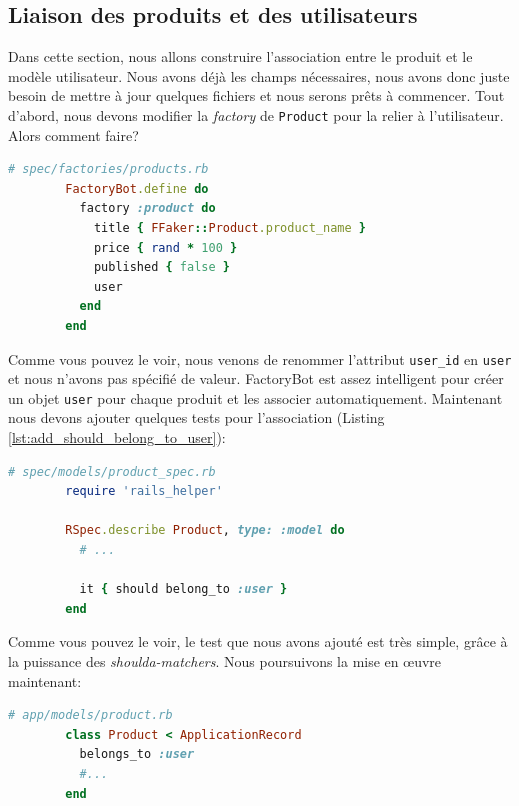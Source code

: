 \documentclass[]{report}
\begin{document}
    \subsection{Liaison des produits et des utilisateurs}\label{subsec:user_has_products}

      Dans cette section, nous allons construire l'association entre le produit et le modèle utilisateur. Nous avons déjà les champs nécessaires, nous avons donc juste besoin de mettre à jour quelques fichiers et nous serons prêts à commencer. Tout d'abord, nous devons modifier la \textit{factory} de \verb|Product| pour la relier à l'utilisateur. Alors comment faire?

      \begin{scriptsize}
        \begin{lstlisting}[language=ruby]
        # spec/factories/products.rb
        FactoryBot.define do
          factory :product do
            title { FFaker::Product.product_name }
            price { rand * 100 }
            published { false }
            user
          end
        end
        \end{lstlisting}
      \end{scriptsize}

      Comme vous pouvez le voir, nous venons de renommer l'attribut \verb|user_id| en \verb|user| et nous n'avons pas spécifié de valeur. FactoryBot est assez intelligent pour créer un objet \verb|user| pour chaque produit et les associer automatiquement. Maintenant nous devons ajouter quelques tests pour l'association (Listing \ref{lst:add_should_belong_to_user}):

      \begin{scriptsize}
        \begin{lstlisting}[language=ruby, caption={Ajout du test de l'association utilisateur au model du produit}, label={lst:add_should_belong_to_user}]
        # spec/models/product_spec.rb
        require 'rails_helper'

        RSpec.describe Product, type: :model do
          # ...

          it { should belong_to :user }
        end
        \end{lstlisting}
      \end{scriptsize}

      Comme vous pouvez le voir, le test que nous avons ajouté est très simple, grâce à la puissance des \textit{shoulda-matchers}. Nous poursuivons la mise en œuvre maintenant:

      \begin{scriptsize}
        \begin{lstlisting}[language=ruby]
        # app/models/product.rb
        class Product < ApplicationRecord
          belongs_to :user
          #...
        end
        \end{lstlisting}
      \end{scriptsize}
\end{document}
